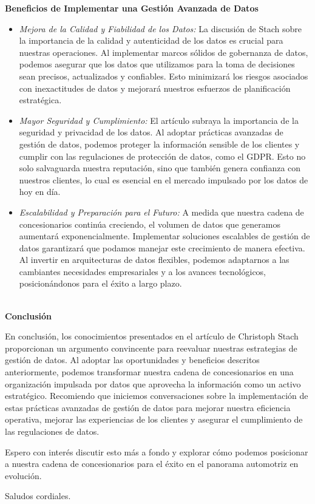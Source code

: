 \textbf{Beneficios de Implementar una Gestión Avanzada de Datos}
\begin{itemize}
    \item \textit{Mejora de la Calidad y Fiabilidad de los Datos:}
    La discusión de Stach sobre la importancia de la calidad y autenticidad de los datos es crucial para nuestras operaciones. Al implementar marcos sólidos de gobernanza de datos, podemos asegurar que los datos que utilizamos para la toma de decisiones sean precisos, actualizados y confiables. Esto minimizará los riesgos asociados con inexactitudes de datos y mejorará nuestros esfuerzos de planificación estratégica.
    
    \item \textit{Mayor Seguridad y Cumplimiento:}
    El artículo subraya la importancia de la seguridad y privacidad de los datos. Al adoptar prácticas avanzadas de gestión de datos, podemos proteger la información sensible de los clientes y cumplir con las regulaciones de protección de datos, como el GDPR. Esto no solo salvaguarda nuestra reputación, sino que también genera confianza con nuestros clientes, lo cual es esencial en el mercado impulsado por los datos de hoy en día.
    \item \textit{Escalabilidad y Preparación para el Futuro:}
    A medida que nuestra cadena de concesionarios continúa creciendo, el volumen de datos que generamos aumentará exponencialmente. Implementar soluciones escalables de gestión de datos garantizará que podamos manejar este crecimiento de manera efectiva. Al invertir en arquitecturas de datos flexibles, podemos adaptarnos a las cambiantes necesidades empresariales y a los avances tecnológicos, posicionándonos para el éxito a largo plazo.
\end{itemize}
 

 

 
\\
\textbf{Conclusión}

En conclusión, los conocimientos presentados en el artículo de Christoph Stach proporcionan un argumento convincente para reevaluar nuestras estrategias de gestión de datos. Al adoptar las oportunidades y beneficios descritos anteriormente, podemos transformar nuestra cadena de concesionarios en una organización impulsada por datos que aprovecha la información como un activo estratégico. Recomiendo que iniciemos conversaciones sobre la implementación de estas prácticas avanzadas de gestión de datos para mejorar nuestra eficiencia operativa, mejorar las experiencias de los clientes y asegurar el cumplimiento de las regulaciones de datos.

Espero con interés discutir esto más a fondo y explorar cómo podemos posicionar a nuestra cadena de concesionarios para el éxito en el panorama automotriz en evolución.

Saludos cordiales.